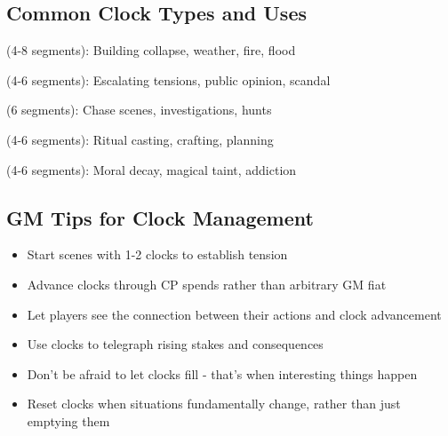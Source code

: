 \subsection*{Common Clock Types and Uses}

\begin{description}[leftmargin=*]
\item[Environmental Clocks] (4-8 segments): Building collapse, weather, fire, flood
\item[Social Clocks] (4-6 segments): Escalating tensions, public opinion, scandal  
\item[Pursuit Clocks] (6 segments): Chase scenes, investigations, hunts
\item[Preparation Clocks] (4-6 segments): Ritual casting, crafting, planning
\item[Corruption Clocks] (4-6 segments): Moral decay, magical taint, addiction
\end{description}

\subsection*{GM Tips for Clock Management}

\begin{itemize}[leftmargin=*]
\item Start scenes with 1-2 clocks to establish tension
\item Advance clocks through CP spends rather than arbitrary GM fiat
\item Let players see the connection between their actions and clock advancement
\item Use clocks to telegraph rising stakes and consequences
\item Don't be afraid to let clocks fill - that's when interesting things happen
\item Reset clocks when situations fundamentally change, rather than just emptying them
\end{itemize}


